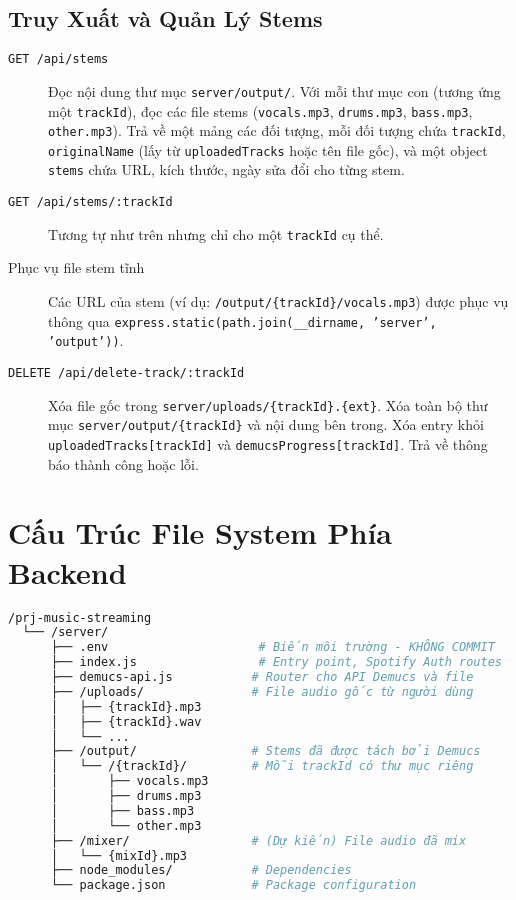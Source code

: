 \documentclass[12pt,a4paper]{article}
\begin{document}
\subsection{Truy Xuất và Quản Lý Stems}
\label{subsec:stems-management}

\begin{description}
    \item[\texttt{GET /api/stems}] Đọc nội dung thư mục \texttt{server/output/}. Với mỗi thư mục con (tương ứng một \texttt{trackId}), đọc các file stems (\texttt{vocals.mp3}, \texttt{drums.mp3}, \texttt{bass.mp3}, \texttt{other.mp3}). Trả về một mảng các đối tượng, mỗi đối tượng chứa \texttt{trackId}, \texttt{originalName} (lấy từ \texttt{uploadedTracks} hoặc tên file gốc), và một object \texttt{stems} chứa URL, kích thước, ngày sửa đổi cho từng stem.
    
    \item[\texttt{GET /api/stems/:trackId}] Tương tự như trên nhưng chỉ cho một \texttt{trackId} cụ thể.
    
    \item[Phục vụ file stem tĩnh] Các URL của stem (ví dụ: \texttt{/output/\{trackId\}/vocals.mp3}) được phục vụ thông qua \texttt{express.static(path.join(\_\_dirname, 'server', 'output'))}.
    
    \item[\texttt{DELETE /api/delete-track/:trackId}] Xóa file gốc trong \texttt{server/uploads/\{trackId\}.\{ext\}}. Xóa toàn bộ thư mục \texttt{server/output/\{trackId\}} và nội dung bên trong. Xóa entry khỏi \texttt{uploadedTracks[trackId]} và \texttt{demucsProgress[trackId]}. Trả về thông báo thành công hoặc lỗi.
\end{description}

\section{Cấu Trúc File System Phía Backend}
\label{sec:file-structure}

\begin{lstlisting}[language=bash, caption=Cấu trúc thư mục backend]
/prj-music-streaming
  └── /server/
      ├── .env                     # Biến môi trường - KHÔNG COMMIT
      ├── index.js                 # Entry point, Spotify Auth routes
      ├── demucs-api.js           # Router cho API Demucs và file
      ├── /uploads/               # File audio gốc từ người dùng
      │   ├── {trackId}.mp3
      │   ├── {trackId}.wav
      │   └── ...
      ├── /output/                # Stems đã được tách bởi Demucs
      │   └── /{trackId}/         # Mỗi trackId có thư mục riêng
      │       ├── vocals.mp3
      │       ├── drums.mp3
      │       ├── bass.mp3
      │       └── other.mp3
      ├── /mixer/                 # (Dự kiến) File audio đã mix
      │   └── {mixId}.mp3
      ├── node_modules/           # Dependencies
      └── package.json            # Package configuration
\end{lstlisting}
\end{document}
